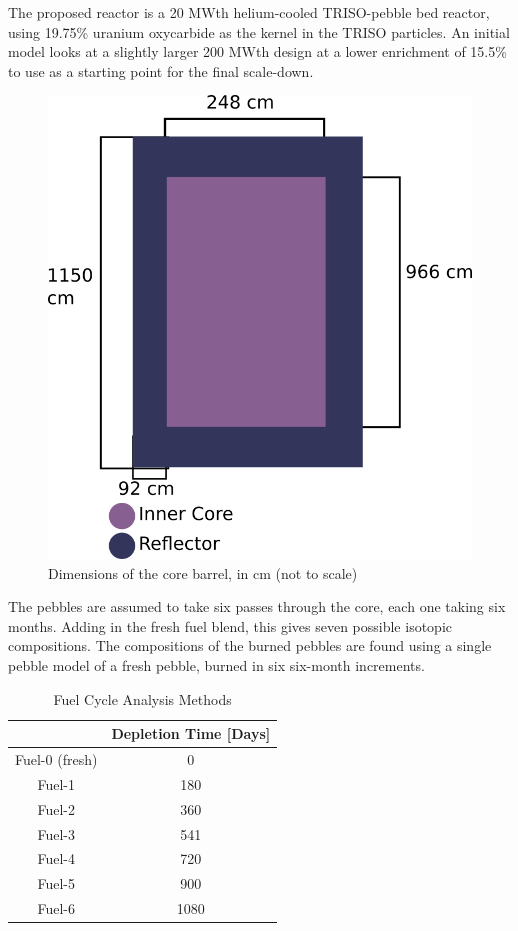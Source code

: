 \documentclass{anstrans}
\begin{document}
The proposed reactor is a 20 MWth helium-cooled TRISO-pebble bed reactor, using 19.75\% uranium oxycarbide as the kernel in the TRISO particles.  An initial model looks at a slightly larger 200 MWth design at a lower enrichment of 15.5\% to use as a starting point for the final scale-down.
\begin{figure}[H]
  \centering
  \includegraphics[width = \linewidth]{reactor-geom}
  \caption{Dimensions of the core barrel, in cm (not to scale)}
  \label{fig:voltage}
\end{figure}

The pebbles are assumed to take six passes through the core, each one taking six months.  Adding in the fresh fuel blend, this gives seven possible isotopic compositions.  The compositions of the burned pebbles are found using a single pebble model of a fresh pebble, burned in six six-month increments.

\begin{table}[H]
  \centering
  \caption{Fuel Cycle Analysis Methods}
  	\begin{tabular}{cc}\toprule
 		& Depletion Time [Days]\\
 		\midrule
 		Fuel-0 (fresh) & 0 \\
 		Fuel-1 & 180 \\
 		Fuel-2 & 360 \\
 		Fuel-3 & 541 \\
 		Fuel-4 & 720 \\
 		Fuel-5 & 900 \\
 		Fuel-6 & 1080 \\
	\bottomrule
	\end{tabular}
  \label{tab:fueltypes}
\end{table}
\end{document}

